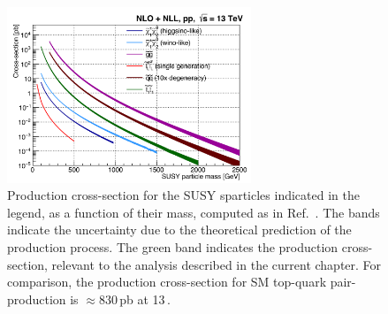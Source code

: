 \begin{figure}[!htb]
    \begin{center}
        \includegraphics[width=0.65\textwidth]{figures/search_stop2l/SUSY_xsec_13TeV_v1}
        \caption{
            Production cross-section for the SUSY sparticles indicated in the legend,
            as a function of their mass, computed as in Ref.~\cite{SUSYXsec1}.
            The bands indicate the uncertainty due to the theoretical prediction of the production
            process.
            The green band indicates the \stopone production cross-section, relevant to the analysis
            described in the current chapter.
            For comparison, the production cross-section for SM top-quark pair-production is $\approx 830$\,pb at 13\,\TeV.
        }
        \label{fig:susy_xsec}
    \end{center}
\end{figure}

\FloatBarrier
%
%





